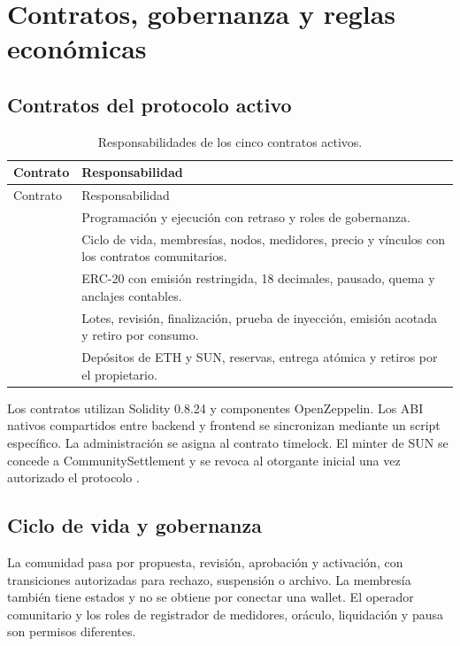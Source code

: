 \section{Contratos, gobernanza y reglas económicas}
\subsection{Contratos del protocolo activo}
\begin{longtable}{L{.28\linewidth}L{.62\linewidth}}
\caption{Responsabilidades de los cinco contratos activos.}\label{tab:contratos}\\
\toprule Contrato & Responsabilidad \\ \midrule\endfirsthead
\toprule Contrato & Responsabilidad \\ \midrule\endhead
{} & Programación y ejecución con retraso y roles de gobernanza.\\
 & Ciclo de vida, membresías, nodos, medidores, precio y vínculos con los contratos comunitarios.\\
 & ERC-20 con emisión restringida, 18 decimales, pausado, quema y anclajes contables.\\
 & Lotes, revisión, finalización, prueba de inyección, emisión acotada y retiro por consumo.\\
 & Depósitos de ETH y SUN, reservas, entrega atómica y retiros por el propietario.\\
\bottomrule
\end{longtable}
Los contratos utilizan Solidity 0.8.24 y componentes OpenZeppelin. Los ABI nativos compartidos entre backend y frontend se sincronizan mediante un script específico. La administración se asigna al contrato timelock. El minter de SUN se concede a CommunitySettlement y se revoca al otorgante inicial una vez autorizado el protocolo \citep{blockchain,contracts}.

\subsection{Ciclo de vida y gobernanza}
La comunidad pasa por propuesta, revisión, aprobación y activación, con transiciones autorizadas para rechazo, suspensión o archivo. La membresía también tiene estados y no se obtiene por conectar una wallet. El operador comunitario y los roles de registrador de medidores, oráculo, liquidación y pausa son permisos diferentes.

